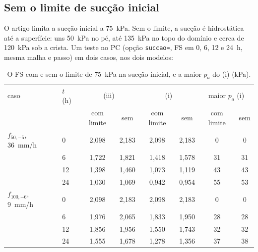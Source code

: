 \documentclass[11pt,a4paper]{article}
\begin{document}
\subsection{Sem o limite de sucção inicial}\label{sec:semlimite}
O artigo limita a sucção inicial a 75~kPa. Sem o limite, a sucção é hidrostática até a superfície: uns 50~kPa no pé,
até 135~kPa no topo do domínio e cerca de 120~kPa sob a crista. Um teste no PC (opção \texttt{succao=}, FS em 0, 6, 12
e 24~h, mesma malha e passo) em dois casos, nos dois modelos:

\begin{table}[H]\centering\small
\caption{O FS com e sem o limite de 75~kPa na sucção inicial, e a maior $p_a$ do (i) (kPa).}\label{tab:semlimite}
\begin{tabular}{ll|cc|cc|cc}
\toprule
caso & $t$ (h) & \multicolumn{2}{c|}{(iii)} & \multicolumn{2}{c|}{(i)} & \multicolumn{2}{c}{maior $p_a$ (i)}\\
 & & com limite & sem & com limite & sem & com limite & sem\\
\midrule
$f_{50,-5}$, 36~mm/h & 0 & 2,098 & 2,183 & 2,098 & 2,183 & 0 & 0\\
 & 6 & 1,722 & 1,821 & 1,418 & 1,578 & 31 & 31\\
 & 12 & 1,398 & 1,460 & 1,073 & 1,119 & 43 & 43\\
 & 24 & 1,030 & 1,069 & 0,942 & 0,954 & 55 & 53\\
\midrule
$f_{100,-6}$, 9~mm/h & 0 & 2,098 & 2,183 & 2,098 & 2,183 & 0 & 0\\
 & 6 & 1,976 & 2,065 & 1,833 & 1,950 & 28 & 28\\
 & 12 & 1,856 & 1,956 & 1,550 & 1,743 & 32 & 32\\
 & 24 & 1,555 & 1,678 & 1,278 & 1,356 & 37 & 38\\
\bottomrule
\end{tabular}
\end{table}
\end{document}
